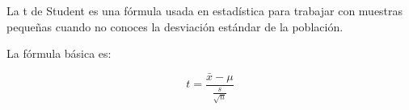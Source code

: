 La t de Student es una fórmula usada en estadística para trabajar con muestras pequeñas cuando no conoces la desviación estándar de la población.

La fórmula básica es:

\[
t = \frac{\bar{x} - \mu}{\frac{s}{\sqrt{n}}}
\]